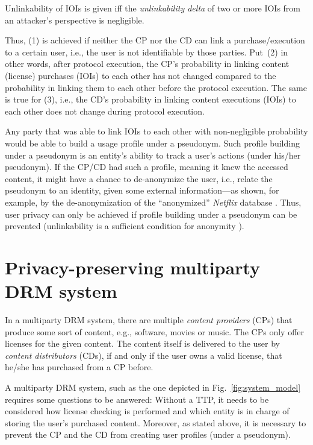 \documentclass{llncs}
\newcommand{\refFig}[1]{Fig.~\ref{#1}}
\begin{document}
\begin{definition}
Unlinkability of IOIs is given iff the \emph{unlinkability delta} of two or more IOIs from an attacker's perspective is negligible. 
\end{definition}

Thus, (1) is achieved if neither the CP nor the CD can link a purchase/execution to a certain user, i.e., the user is not identifiable by those parties. Put~(2) in other words, after protocol execution, the CP's probability in linking content (license) purchases (IOIs) to each other has not changed compared to the probability in linking them to each other before the protocol execution. The same is true for (3), i.e., the CD's probability in linking content executions (IOIs) to each other does not change during protocol execution. 

Any party that was able to link IOIs to each other with non-negligible probability would be able to build a usage profile under a pseudonym. Such profile building under a pseudonym is an entity's ability to track a user's actions (under his/her pseudonym). If the CP/CD had such a profile, meaning it knew the accessed content, it might have a chance to de-anonymize the user, i.e., relate the pseudonym to an identity, given some external information---as shown, for example, by the de-anonymization of the ``anonymized'' \emph{Netflix} database \cite{netflix}. Thus, user privacy can only be achieved if profile building under a pseudonym can be prevented (unlinkability is a sufficient condition for anonymity \cite{unlinkability}).





\section{Privacy-preserving multiparty DRM system} \label{concept}

In a multiparty DRM system, there are multiple \emph{content providers} (CPs) that produce some sort of content, e.g., software, movies or music. The CPs only offer licenses for the given content. The content itself is delivered to the user by \emph{content distributors} (CDs), if and only if the user owns a valid license, that he/she has purchased from a CP before.


A multiparty DRM system, such as the one depicted in \refFig{fig:system_model} requires some questions to be answered: Without a TTP, it needs to be considered how license checking is performed and which entity is in charge of storing the user's purchased content. Moreover, as stated above, it is necessary to prevent the CP and the CD from creating user profiles (under a pseudonym).
\end{document}
